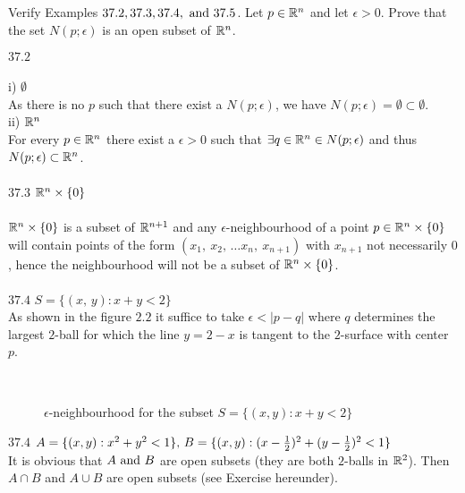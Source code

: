 \newpage


\renewcommand{\thesubsection}{\thesection.\arabic{subsection}}
\setcounter{subsection}{0}

\subsection{}
\begin{tcolorbox}
Verify Examples $37.2, 37.3, 37.4, \text{ and } 37.5$. Let $p \in \mathbb{R}^n$ and let $\epsilon > 0$. Prove that the set $N(p;\epsilon)$ is an open subset of $\mathbb{R}^n$.
\end{tcolorbox}
$\mathbf{37.2}$\\\\

i) $\emptyset$\\
As there is no $p$ such that there exist a $N(p;\epsilon)$, we have $N(p;\epsilon)=\emptyset\subset \emptyset$.\\
ii) $\mathbb{R}^n$\\
For every $p\in \mathbb{R}^n$ there exist a $\epsilon>0$ such that $\exists q\in\mathbb{R}^n\in N(p;\epsilon)$ and thus $N(p;\epsilon)\subset \mathbb{R}^n$.\\\\
$\mathbf{37.3}$ $\mathbb{R}^n\times \{0\}$\\\\
$\mathbb{R}^n\times \{0\}$ is a subset of $\mathbb{R}^{n+1}$ and any $\epsilon$-neighbourhood of a point $p\in \mathbb{R}^n\times \{0\}$ will contain points of the form $(x_1,\ x_2,\, \dots x_n,\ x_{n+1})$ with $x_{n+1}$ not necessarily $0$, hence the neighbourhood will not be a subset of $\mathbb{R}^n\times \{0\}$.\\\\
$\mathbf{37.4}$ $ S=\{(x,\, y): x+y<2\}$\\
As shown in the figure $2.2$ it suffice to take $\epsilon <|p-q|$ where $q$ determines the largest $2$-ball for which the line $y=2-x$ is tangent to the $2$-surface with center $p$.
\begin{figure}[H]%
    \centering
\\
\caption{$\epsilon$-neighbourhood for the subset $S=\{(x,y):x+y<2\}$  }
\label{fig:fig_p8a}
\end{figure}
$\mathbf{37.4}$ $ A=\{(x,y): x^2+y^2<1\},\, B=\{(x,y): (x-\frac{1}{2})^2+(y-\frac{1}{2})^2<1\}$\\
It is obvious that $A\text{ and } B$ are open subsets (they are both $2$-balls in $\mathbb{R}^2$). Then $A\cap B$ and $A\cup B$ are open subsets (see Exercise hereunder).\\

